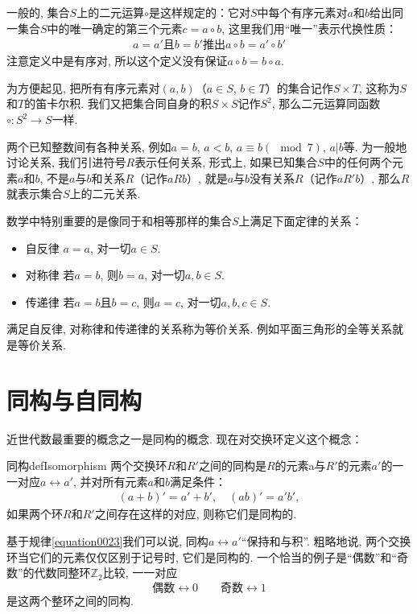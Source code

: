 一般的, 集合$S$上的二元运算$\circ$是这样规定的：它对$S$中每个有序元素对$a$和$b$给出同一集合$S$中的唯一确定的第三个元素$c=a \circ b$, 这里我们用“唯一”表示代换性质：
\begin{gather}\label{equation0022}
a=a'\text{且}b=b'\text{推出}a \circ b = a' \circ b'
\end{gather}
注意定义中是有序对, 所以这个定义没有保证$a \circ b = b \circ a$. 

为方便起见, 把所有有序元素对$(a, b)$（$a \in S$, $b \in T$）的集合记作$S \times T$, 这称为$S$和$T$的笛卡尔积. 我们又把集合同自身的积$S \times S$记作$S^2$, 那么二元运算同函数$\circ: S^2 \to S$一样. 

两个已知整数间有各种关系, 例如$a=b$, $a<b$, $a \equiv b(\mod{7})$, $a|b$等. 为一般地讨论关系, 我们引进符号$R$表示任何关系, 形式上, 如果已知集合$S$中的任何两个元素$a$和$b$, 不是$a$与$b$和关系$R$（记作$aRb$）, 就是$a$与$b$没有关系$R$（记作$aR'b$）, 那么$R$就表示集合$S$上的二元关系. 

数学中特别重要的是像同于和相等那样的集合$S$上满足下面定律的关系：
\begin{itemize}
\item 自反律 $a=a$, 对一切$a \in S$. 
\item 对称律 若$a=b$, 则$b=a$, 对一切$a, b \in S$. 
\item 传递律 若$a=b$且$b=c$, 则$a=c$, 对一切$a, b, c \in S$. 
\end{itemize}
满足自反律, 对称律和传递律的关系称为等价关系. 例如平面三角形的全等关系就是等价关系. 


\section{同构与自同构}\label{subsection0010112}
近世代数最重要的概念之一是同构的概念. 现在对交换环定义这个概念：
\begin{definition}{同构}{defIsomorphism}
两个交换环$R$和$R'$之间的同构是$R$的元素a与$R'$的元素$a'$的一一对应$a \leftrightarrow a'$, 并对所有元素$a$和$b$满足条件：
\begin{gather}\label{equation0023}
(a+b)'=a'+b',\quad (ab)'=a'b',
\end{gather}
如果两个环$R$和$R'$之间存在这样的对应, 则称它们是同构的. 
\end{definition}
基于规律\ref{equation0023}我们可以说, 同构$a \leftrightarrow a'$“保持和与积”. 粗略地说, 两个交换环当它们的元素仅仅区别于记号时, 它们是同构的. 一个恰当的例子是“偶数”和“奇数”的代数同整环$\mathbb{Z}_2$比较, 一一对应
\[
\text{偶数}\leftrightarrow 0 \quad\quad \text{奇数}\leftrightarrow 1
\]
是这两个整环之间的同构. 

